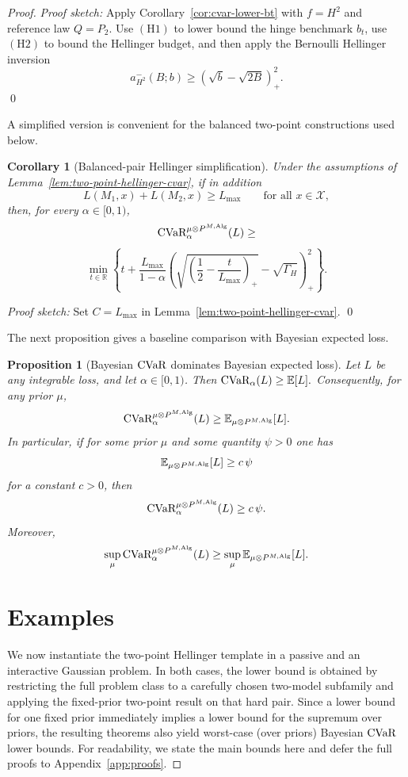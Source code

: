 \documentclass[conference]{IEEEtran}
\newtheorem{proposition}{Proposition}
\newtheorem{corollary}{Corollary}
\begin{document}
\begin{proof}[Proof]
\textit{Proof sketch:}
Apply Corollary~\ref{cor:cvar-lower-bt} with \(f=H^2\) and reference law \(Q=P_2\). Use \((\mathrm{H1})\) to lower bound the hinge benchmark \(b_t\), use \((\mathrm{H2})\) to bound the Hellinger budget, and then apply the Bernoulli Hellinger inversion
\[
a^-_{H^2}(B;b)\ge (\sqrt b-\sqrt{2B})_+^2.
\]
\qed

A simplified version is convenient for the balanced two-point constructions used below.

\begin{corollary}[Balanced-pair Hellinger simplification]
\label{cor:balanced-two-point-hellinger}
Under the assumptions of Lemma~\ref{lem:two-point-hellinger-cvar}, if in addition
\[
L(M_1,x)+L(M_2,x)\ge L_{\max}
\qquad
\text{for all }x\in\mathcal X,
\tag{H3}
\]
then, for every \(\alpha\in[0,1)\),
\[
\textup{CVaR}_\alpha^{\mu\otimes P^{M,\textup{Alg}}}(L)
\ge
\]
\[
\min_{t\in\mathbb R}
\left\{
t+\frac{L_{\max}}{1-\alpha}
\left(
\sqrt{\left(\frac12-\frac{t}{L_{\max}}\right)_+}
-\sqrt{\Gamma_H}
\right)_+^2
\right\}.
\]
\end{corollary}

\textit{Proof sketch:}
Set \(C=L_{\max}\) in Lemma~\ref{lem:two-point-hellinger-cvar}. \qed

The next proposition gives a baseline comparison with Bayesian expected loss.

\begin{proposition}[Bayesian \(\textup{CVaR}\) dominates Bayesian expected loss]
\label{prop:cvar-dominates-bayes-risk}
Let \(L\) be any integrable loss, and let \(\alpha\in[0,1)\). Then
\(
\textup{CVaR}_\alpha(L)\ge \mathbb{E}[L].
\)
Consequently, for any prior \(\mu\),
\[
\textup{CVaR}_\alpha^{\mu\otimes P^{M,\textup{Alg}}}(L)
\ge
\mathbb{E}_{\mu\otimes P^{M,\textup{Alg}}}[L].
\]
In particular, if for some prior \(\mu\) and some quantity \(\psi>0\) one has
\[
\mathbb{E}_{\mu\otimes P^{M,\textup{Alg}}}[L]\ge c\,\psi
\]
for a constant \(c>0\), then
\[
\textup{CVaR}_\alpha^{\mu\otimes P^{M,\textup{Alg}}}(L)\ge c\,\psi.
\]
Moreover,
\[
\sup_{\mu}\textup{CVaR}_\alpha^{\mu\otimes P^{M,\textup{Alg}}}(L)
\ge
\sup_{\mu}\mathbb{E}_{\mu\otimes P^{M,\textup{Alg}}}[L].
\]
\end{proposition}


\section{Examples}
\label{sec:examples}

We now instantiate the two-point Hellinger template in a passive and an interactive Gaussian problem. In both cases, the lower bound is obtained by restricting the full problem class to a carefully chosen two-model subfamily and applying the fixed-prior two-point result on that hard pair. Since a lower bound for one fixed prior immediately implies a lower bound for the supremum over priors, the resulting theorems also yield worst-case (over priors) Bayesian \(\textup{CVaR}\) lower bounds. For readability, we state the main bounds here and defer the full proofs to Appendix~\ref{app:proofs}.


\end{proof}
\end{document}
